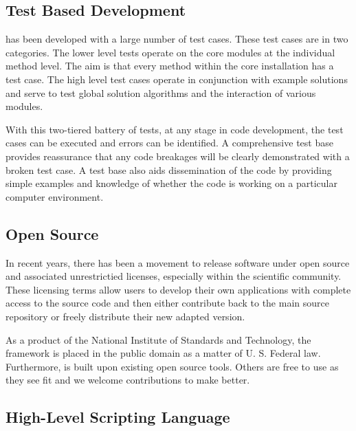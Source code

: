 \subsection{Test Based Development}

\FiPy{} has been developed with a large number of test cases.  These
test cases are in two categories.  The lower level tests operate on
the core modules at the individual method level.  The aim is that
every method within the core installation has a test case.  The high
level test cases operate in conjunction with example solutions and
serve to test global solution algorithms and the interaction of
various modules.  

With this two-tiered battery of tests, at any stage in code
development, the test cases can be executed and errors can be
identified.  A comprehensive test base provides reassurance that any
code breakages will be clearly demonstrated with a broken test case.
A test base also aids dissemination of the code by providing simple
examples and knowledge of whether the code is working on a particular
computer environment.

\subsection{Open Source}

In recent years, there has been a movement to release software under
open source and associated unrestrictied licenses, especially within
the scientific community.  These licensing terms allow users to
develop their own applications with complete access to the source code
and then either contribute back to the main source repository or
freely distribute their new adapted version.  

As a product of the National Institute of Standards and Technology,
the \FiPy{} framework is placed in the public domain as a matter of U.
S. Federal law. Furthermore, \FiPy{} is built upon existing open source 
tools. Others are free to use \FiPy{} as they see fit and we welcome
contributions to make \FiPy{} better.

\subsection{High-Level Scripting Language}

